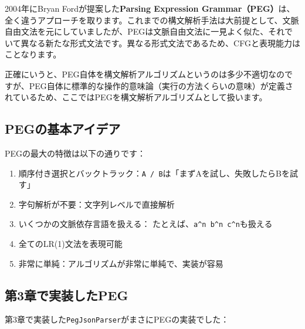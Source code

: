 2004年にBryan Fordが提案した\textbf{Parsing Expression
Grammar（PEG）}は、全く違うアプローチを取ります。これまでの構文解析手法は大前提として、文脈自由文法を元にしていましたが、PEGは文脈自由文法に一見よく似た、それでいて異なる新たな形式文法です。異なる形式文法であるため、CFGと表現能力はことなります。

正確にいうと、PEG自体を構文解析アルゴリズムというのは多少不適切なのですが、PEG自体に標準的な操作的意味論（実行の方法くらいの意味）が定義されているため、ここではPEGを構文解析アルゴリズムとして扱います。

\hypertarget{chapter5-pegux306eux57faux672cux30a2ux30a4ux30c7ux30a2}{%
\subsection{PEGの基本アイデア}\label{chapter5-pegux306eux57faux672cux30a2ux30a4ux30c7ux30a2}}

PEGの最大の特徴は以下の通りです：

\begin{enumerate}
\def\labelenumi{\arabic{enumi}.}
\tightlist
\item
  順序付き選択とバックトラック：\texttt{A\ /\ B}は「まずAを試し、失敗したらBを試す」
\item
  字句解析が不要：文字列レベルで直接解析
\item
  いくつかの文脈依存言語を扱える：
  たとえば、\texttt{a\^{}n\ b\^{}n\ c\^{}n}も扱える
\item
  全てのLR(1)文法を表現可能
\item
  非常に単純：アルゴリズムが非常に単純で、実装が容易
\end{enumerate}

\hypertarget{chapter5-ux7b2c3ux7ae0ux3067ux5b9fux88c5ux3057ux305fpeg}{%
\subsection{第3章で実装したPEG}\label{chapter5-ux7b2c3ux7ae0ux3067ux5b9fux88c5ux3057ux305fpeg}}

第3章で実装した\texttt{PegJsonParser}がまさにPEGの実装でした：

\begin{Shaded}
\begin{Highlighting}[]
 \NormalTok{() \{}
    \NormalTok{ \{}
        \NormalTok{();}
        \NormalTok{();}
         \NormalTok{(} \NormalTok{\textless{}\textgreater{}());}
\NormalTok{    \} }\NormalTok{ (}
        \NormalTok{();}
\NormalTok{    \}}
\NormalTok{\}}
\end{Highlighting}
\end{Shaded}

